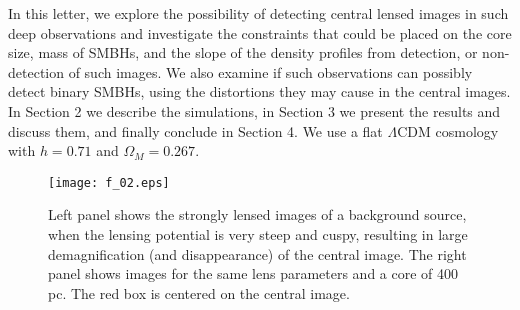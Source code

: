\documentclass[chicago]{emulateapj}
\begin{document}
 In this letter, we explore the possibility of detecting central lensed images in such deep observations and investigate the constraints that could be placed on the core size, mass of SMBHs, and the slope of the density profiles from detection, or non-detection of such images. We also examine if 
 such observations can possibly detect binary SMBHs, using the distortions they may cause in the central images. 
 In Section 2 we describe the simulations, in Section 3 we present the results and discuss them, and finally conclude in Section 4. We use a flat $\Lambda$CDM cosmology with $h=0.71$ and $\Omega_M=0.267$.
 


\begin{figure}
\begin{center}
\centering
\texttt{[image: f\_02.eps]}
\centering
\end{center}
\caption{ Left panel shows the strongly lensed images of a background source, when the lensing potential is very steep and cuspy, resulting in large demagnification (and disappearance) of the central image.  The right panel shows images for the same lens parameters and a core of 400 pc. The red box is centered on the  central image.
\label{fig1}}
\end{figure}
\end{document}
